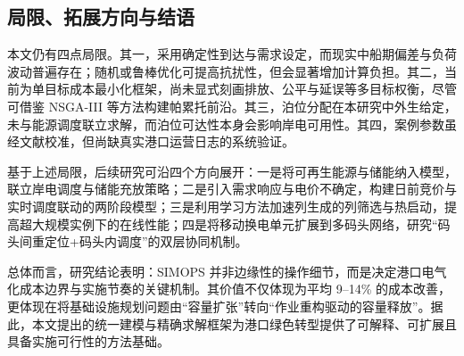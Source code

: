 \documentclass[UTF8, a4paper, 12pt]{ctexart}
\begin{document}
\subsection{局限、拓展方向与结语}
\label{sec:limitations}

本文仍有四点局限。其一，采用确定性到达与需求设定，而现实中船期偏差与负荷波动普遍存在\cite{UNCTAD2021}；随机或鲁棒优化可提高抗扰性，但会显著增加计算负担。其二，当前为单目标成本最小化框架，尚未显式刻画排放、公平与延误等多目标权衡，尽管可借鉴 NSGA-III 等方法构建帕累托前沿\cite{Wang2024_SP}。其三，泊位分配在本研究中外生给定，未与能源调度联立求解，而泊位可达性本身会影响岸电可用性\cite{Dai2020}。其四，案例参数虽经文献校准\cite{UNCTAD2021, ICCT2023}，但尚缺真实港口运营日志的系统验证。

基于上述局限，后续研究可沿四个方向展开：一是将可再生能源与储能纳入模型，联立岸电调度与储能充放策略\cite{Li2022_BSS}；二是引入需求响应与电价不确定，构建日前竞价与实时调度联动的两阶段模型；三是利用学习方法加速列生成的列筛选与热启动，提高超大规模实例下的在线性能\cite{Bengio2021}；四是将移动换电单元扩展到多码头网络，研究“码头间重定位+码头内调度”的双层协同机制。

总体而言，研究结论表明：SIMOPS 并非边缘性的操作细节，而是决定港口电气化成本边界与实施节奏的关键机制。其价值不仅体现为平均 9--14\% 的成本改善，更体现在将基础设施规划问题由“容量扩张”转向“作业重构驱动的容量释放”。据此，本文提出的统一建模与精确求解框架为港口绿色转型提供了可解释、可扩展且具备实施可行性的方法基础。

\FloatBarrier


\end{document}
